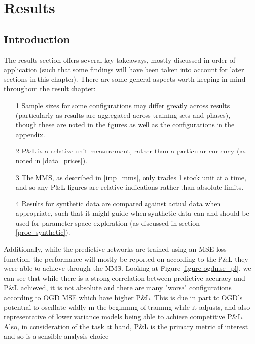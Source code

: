\documentclass[a4paper,11pt,oneside]{article}
\theoremstyle{plain}
\theoremstyle{definition}
\begin{document}
	
	
	
	
	
	
	
	
	
	\newpage
	\section{Results}\label{Results}
	\subsection{Introduction}\label{results_into}
	
	The results section offers several key takeaways, mostly discussed in order of application (such that some findings will have been taken into account for later sections in this chapter). There are some general aspects worth keeping in mind throughout the result chapter:
	\begin{itemize}
		\item[1] Sample sizes for some configurations may differ greatly across results (particularly as results are aggregated across training sets and phases), though these are noted in the figures as well as the configurations in the appendix.
		\item[2] P\&L is a relative unit measurement, rather than a particular currency (as noted in \ref{data_prices}).
		\item[3] The MMS, as described in \ref{imp_mms}, only trades 1 stock unit at a time, and so any P\&L figures are relative indications rather than absolute limits.
		\item[4]  Results for synthetic data are compared against actual data when appropriate, such that it might guide when synthetic data can and should be used for parameter space exploration (as discussed in section \ref{proc_synthetic}).
	\end{itemize}
	
	Additionally, while the predictive networks are trained using an MSE loss function, the performance will mostly be reported on according to the P\&L they were able to achieve through the MMS. Looking at Figure \ref{figure-ogdmse_pl}, we can see that while there is a strong correlation between predictive accuracy and P\&L achieved, it is not absolute and there are many "worse" configurations according to OGD MSE which have higher P\&L. This is due in part to OGD's potential to oscillate wildly in the beginning of training while it adjusts, and also representative of lower variance models being able to achieve competitive P\&L. Also, in consideration of the task at hand, P\&L is the primary metric of interest and so is a sensible analysis choice.
	
\end{document}

